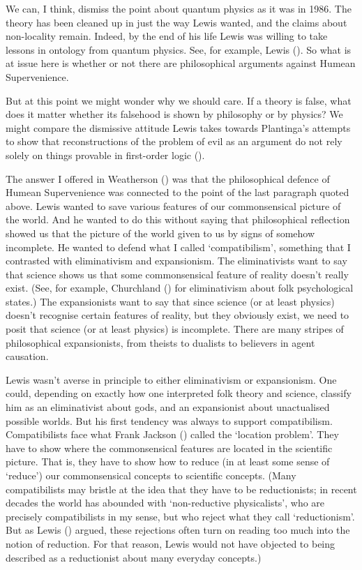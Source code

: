 \documentclass[
  11pt,
  letterpaper,
  DIV=11,
  numbers=noendperiod,
  twoside]{scrartcl}
\begin{document}
We can, I think, dismiss the point about quantum physics as it was in
1986. The theory has been cleaned up in just the way Lewis wanted, and
the claims about non-locality remain. Indeed, by the end of his life
Lewis was willing to take lessons in ontology from quantum physics. See,
for example, Lewis (). So what is at
issue here is whether or not there are philosophical arguments against
Humean Supervenience.

But at this point we might wonder why we should care. If a theory is
false, what does it matter whether its falsehood is shown by philosophy
or by physics? We might compare the dismissive attitude Lewis takes
towards Plantinga's attempts to show that reconstructions of the problem
of evil as an argument do not rely solely on things provable in
first-order logic ().

The answer I offered in Weatherson
() was that the philosophical
defence of Humean Supervenience was connected to the point of the last
paragraph quoted above. Lewis wanted to save various features of our
commonsensical picture of the world. And he wanted to do this without
saying that philosophical reflection showed us that the picture of the
world given to us by signs of somehow incomplete. He wanted to defend
what I called `compatibilism', something that I contrasted with
eliminativism and expansionism. The eliminativists want to say that
science shows us that some commonsensical feature of reality doesn't
really exist. (See, for example, Churchland
() for eliminativism about folk
psychological states.) The expansionists want to say that since science
(or at least physics) doesn't recognise certain features of reality, but
they obviously exist, we need to posit that science (or at least
physics) is incomplete. There are many stripes of philosophical
expansionists, from theists to dualists to believers in agent causation.

Lewis wasn't averse in principle to either eliminativism or
expansionism. One could, depending on exactly how one interpreted folk
theory and science, classify him as an eliminativist about gods, and an
expansionist about unactualised possible worlds. But his first tendency
was always to support compatibilism. Compatibilists face what Frank
Jackson () called the `location
problem'. They have to show where the commonsensical features are
located in the scientific picture. That is, they have to show how to
reduce (in at least some sense of `reduce') our commonsensical concepts
to scientific concepts. (Many compatibilists may bristle at the idea
that they have to be reductionists; in recent decades the world has
abounded with `non-reductive physicalists', who are precisely
compatibilists in my sense, but who reject what they call
`reductionism'. But as Lewis () argued,
these rejections often turn on reading too much into the notion of
reduction. For that reason, Lewis would not have objected to being
described as a reductionist about many everyday concepts.)
\end{document}
